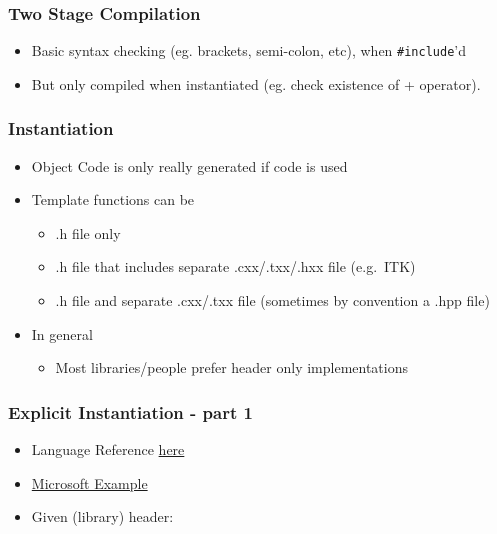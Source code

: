 \hypertarget{two-stage-compilation}{%
\subsubsection{Two Stage Compilation}\label{two-stage-compilation}}

\begin{itemize}
\tightlist
\item
  Basic syntax checking (eg. brackets, semi-colon, etc), when
  \texttt{\#include}'d
\item
  But only compiled when instantiated (eg. check existence of +
  operator).
\end{itemize}

\hypertarget{instantiation}{%
\subsubsection{Instantiation}\label{instantiation}}

\begin{itemize}
\tightlist
\item
  Object Code is only really generated if code is used
\item
  Template functions can be

  \begin{itemize}
  \tightlist
  \item
    .h file only
  \item
    .h file that includes separate .cxx/.txx/.hxx file (e.g.~ITK)
  \item
    .h file and separate .cxx/.txx file (sometimes by convention a .hpp
    file)
  \end{itemize}
\item
  In general

  \begin{itemize}
  \tightlist
  \item
    Most libraries/people prefer header only implementations
  \end{itemize}
\end{itemize}

\hypertarget{explicit-instantiation---part-1}{%
\subsubsection{Explicit Instantiation - part
1}\label{explicit-instantiation---part-1}}

\begin{itemize}
\item
  Language Reference
  \href{http://en.cppreference.com/w/cpp/language/function_template}{here}
\item
  \href{http://msdn.microsoft.com/en-us/library/by56e477\%28VS.80\%29.aspx}{Microsoft
  Example}
\item
  Given (library) header:
\end{itemize}

